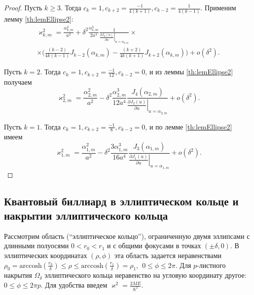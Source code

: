 \begin{proof}
Пусть $k \geq 3$. Тогда $c_k = 1, c_{k+2}=\frac{-1}{4(k+1)},  c_{k-2}=\frac{1}{4(k-1)}$. Применим лемму \ref{th:lemEllipse2}:
\begin{multline*}
\varkappa_{k, m}^2 = 
\frac{\alpha_{k, m}^2}{a^2} +  \delta^2 \frac{\alpha_{k, m}^3}{2 a^4}\frac{1}{\left.\frac{\partial J_{k} (u)}{\partial u}\right|_{u=\alpha_{k, m}}} \times \\ \times
\biggl(
\frac{(k-2)}{4k(k-1) } J_{k-2}(\alpha_{k, m}) - \frac{(k+2)}{4k(k+1) } J_{k+2}(\alpha_{k, m})
\biggr) + o(\delta^2).
\end{multline*}

Пусть $k =2$. Тогда $c_k = 1, c_{k+2}=\frac{-1}{12},  c_{k-2}=0$, и из леммы \ref{th:lemEllipse2} получаем
$$
\varkappa_{2, m}^2 = 
\frac{\alpha_{2, m}^2}{a^2} -  \delta^2 \frac{\alpha_{2, m}^3}{12 a^4}\frac{J_{4}(\alpha_{2, m})}{\left.\frac{\partial J_{2} (u)}{\partial u}\right|_{u=\alpha_{2, m}}} 
 + o(\delta^2).
$$

Пусть $k =1$. Тогда $c_k = 1, c_{k+2}=\frac{-1}{8},  c_{k-2}=0$, и по лемме \ref{th:lemEllipse2} имеем
$$
\varkappa_{1, m}^2 = 
\frac{\alpha_{1, m}^2}{a^2} -  \delta^2 \frac{3\alpha_{1, m}^3}{16 a^4}\frac{ J_{3}(\alpha_{1, m})}{\left.\frac{\partial J_{1} (u)}{\partial u}\right|_{u=\alpha_{1, m}}}  + o(\delta^2).
$$
\end{proof}



\subsection{Квантовый биллиард в эллиптическом кольце и накрытии эллиптического кольца}\label{sec:ch1/sec2/sub3}

Рассмотрим область (``эллиптическое кольцо''), ограниченную двумя эллипсами с длинными полуосями $0 < r_0 < r_1$ и с общими фокусами в точках $(\pm \delta, 0)$. 
В эллиптических координатах $(\rho, \phi)$ эта область   задается неравенствами $\rho_0 = \text{arccosh} (\frac{r_0}{\delta}) \leq \rho \leq \text{arccosh} (\frac{r_1}{\delta}) = \rho_1, \hspace{5pt} 0 \leq \phi \leq 2 \pi$. 
Для $p$-листного накрытия  $\Omega_\delta$ эллиптического кольца неравенство на угловую координату другое: $0 \leq \phi \leq 2 \pi p$. Для удобства введем $\varkappa^2 = \frac{2 M E}{\hbar^2}$.

